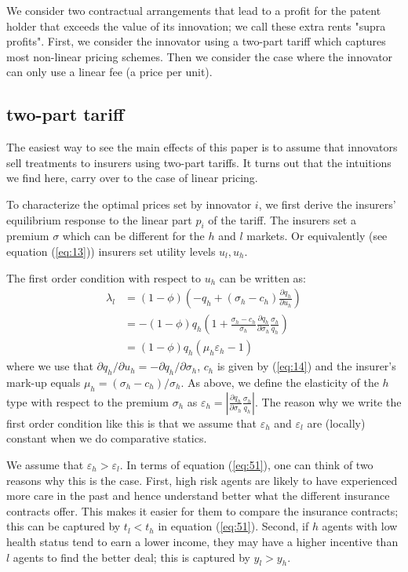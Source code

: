 \documentclass[12pt,english,a4paper]{article}
\begin{document}
We consider two contractual arrangements that lead to a profit for the patent holder that exceeds the value of its innovation; we call these extra rents "supra profits". First, we consider the innovator using a two-part tariff which captures most non-linear pricing schemes. Then we consider the case where the innovator can only use a linear fee (a price per unit).

\subsection{two-part tariff}
\label{sec:org3dadc4a}

The easiest way to see the main effects of this paper is to assume that innovators sell treatments to insurers using two-part tariffs. It turns out that the intuitions we find here, carry over to the case of linear pricing.

To characterize the optimal prices set by innovator \(i\), we first derive the insurers' equilibrium response to the linear part \(p_i\) of the tariff. The insurers set a premium \(\sigma\) which can be different for the \(h\) and \(l\) markets. Or equivalently (see equation (\ref{eq:13})) insurers set utility levels \(u_l,u_h\).

The first order condition with respect to \(u_h\) can be written as:
\begin{align}
\nonumber
\lambda_l &= (1-\phi) \left(-q_h + (\sigma_h-c_h) \frac{\partial q_h}{\partial u_h}   \right)\\
\nonumber &=- (1-\phi) q_h \left(1 + \frac{\sigma_h-c_h}{\sigma_h} \frac{\partial q_h}{\partial \sigma_h} \frac{\sigma_h}{q_{h}}   \right)\\
\label{eq:26}
          & = (1-\phi) q_h (\mu_h \varepsilon_h-1)
\end{align}
where we use that \(\partial q_h/\partial u_h = - \partial q_h/\partial \sigma_h\), \(c_h\) is given by (\ref{eq:14}) and the insurer's mark-up equals \(\mu_h = (\sigma_{h}-c_h)/\sigma_h\). As above, we define the elasticity of the \(h\) type with respect to the premium \(\sigma_h\) as \(\varepsilon_h = |\frac{\partial q_h}{\partial \sigma_h} \frac{\sigma_h}{q_{h}}|\). The reason why we write the first order condition like this is that we assume that \(\varepsilon_h\) and \(\varepsilon_l\) are (locally) constant when we do comparative statics.

We assume that \(\varepsilon_{h} > \varepsilon_{l}\). In terms of equation (\ref{eq:51}), one can think of two reasons why this is the case. First, high risk agents are likely to have experienced more care in the past and hence understand better what the different insurance contracts offer. This makes it easier for them to compare the insurance contracts; this can be captured by \(t_l<t_h\) in equation (\ref{eq:51}). Second, if \(h\) agents with low health status tend to earn a lower income, they may have a higher incentive than \(l\) agents to find the better deal; this is captured by \(y_l>y_h\).
\end{document}

